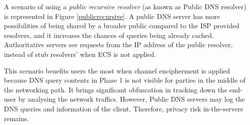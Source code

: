 A scenario of using a \textit{public recursive resolver} (as known as Public DNS resolver) is represented in Figure \ref{publicrecursive}.
A public DNS server has more possibilities of being shared by a broader public compared to the ISP provided resolvers, and it increases the chances of queries being already cached. Authoritative servers see requests from the IP address of the public resolver, instead of stub resolvers' when ECS is not applied.

This scenario benefits users the most when channel encipherment is applied because DNS query contents in Phase 1 is not visible for parties in the middle of the networking path. It brings significant obfuscation in tracking down the end-user by analysing the network traffics. However, Public DNS servers may log the DNS queries and information of the client. Therefore, privacy risk in-the-servers remains.
